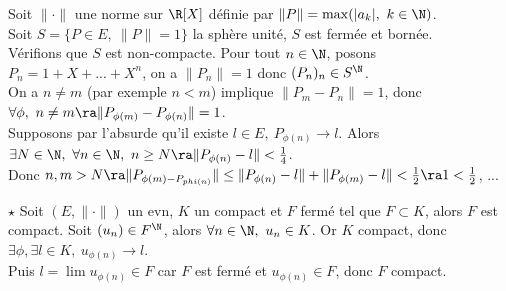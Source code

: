 \documentclass[11pt]{article}
\begin{document}
\vspace*{-0.8cm}

\begin{ex}{}{}
    Soit $\|\cdot\|$ une norme sur $\R[X]$ définie par $\|P\|=\max(|a_k|, ~ k \in \N)$.\\
    Soit $S=\{P \in E, ~ \|P\|=1\}$ la sphère unité, $S$ est fermée et bornée.\\
    Vérifions que $S$ est non-compacte.
    \tcblower
    Pour tout $n\in\N$, posons $P_n=1+X+...+X^n$, on a $\|P_n\|=1$ donc $(P_n)_n\in S^\N$.\\
    On a $n \neq m$ (par exemple $n<m$) implique $\|P_m - P_n\|=1$, donc $\forall \phi, ~ n \neq m \ra \|P_{\phi(m)} - P_{\phi(n)}\|=1$.\\
    Supposons par l'absurde qu'il existe $l\in E, ~ P_{\phi(n)}\to l$. Alors $\exists N \in \N, ~ \forall n \in \N, ~ n\geq N \ra \|P_{\phi(n)}-l\|<\frac{1}{4}$.\\
    Donc $n,m>N\ra \|P_{\phi(m)-P_{phi(n)}}\|\leq \|P_{\phi(n)} - l\| + \|P_{\phi(m)} - l\| < \frac{1}{2} \ra 1 < \frac{1}{2}$, ...
\end{ex}

\vspace*{-0.8cm}

\begin{prop}{$\star$}{}
    Soit $(E,\|\cdot\|)$ un evn, $K$ un compact et $F$ fermé tel que $F\subset K$, alors $F$ est compact.
    \tcblower
    Soit $(u_n)\in F^\N$, alors $\forall n \in \N, ~ u_n \in K$. Or $K$ compact, donc $\exists \phi, \exists l \in K, ~ u_{\phi(n)}\to l$.\\
    Puis $l=\lim u_{\phi(n)}\in F$ car $F$ est fermé et $u_{\phi(n)}\in F$, donc $F$ compact.
\end{prop}

\vspace*{-0.8cm}
\end{document}
